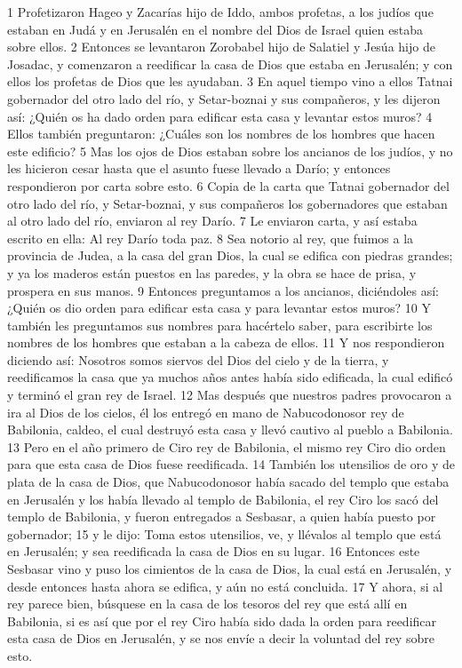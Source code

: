 1 Profetizaron Hageo y Zacarías hijo de Iddo, ambos profetas, a los judíos que estaban en Judá y en Jerusalén en el nombre del Dios de Israel quien estaba sobre ellos.
2 Entonces se levantaron Zorobabel hijo de Salatiel y Jesúa hijo de Josadac, y comenzaron a reedificar la casa de Dios que estaba en Jerusalén; y con ellos los profetas de Dios que les ayudaban.
3 En aquel tiempo vino a ellos Tatnai gobernador del otro lado del río, y Setar-boznai y sus compañeros, y les dijeron así: ¿Quién os ha dado orden para edificar esta casa y levantar estos muros?
4 Ellos también preguntaron: ¿Cuáles son los nombres de los hombres que hacen este edificio?
5 Mas los ojos de Dios estaban sobre los ancianos de los judíos, y no les hicieron cesar hasta que el asunto fuese llevado a Darío; y entonces respondieron por carta sobre esto.
6 Copia de la carta que Tatnai gobernador del otro lado del río, y Setar-boznai, y sus compañeros los gobernadores que estaban al otro lado del río, enviaron al rey Darío.
7 Le enviaron carta, y así estaba escrito en ella: Al rey Darío toda paz.
8 Sea notorio al rey, que fuimos a la provincia de Judea, a la casa del gran Dios, la cual se edifica con piedras grandes; y ya los maderos están puestos en las paredes, y la obra se hace de prisa, y prospera en sus manos.
9 Entonces preguntamos a los ancianos, diciéndoles así: ¿Quién os dio orden para edificar esta casa y para levantar estos muros?
10 Y también les preguntamos sus nombres para hacértelo saber, para escribirte los nombres de los hombres que estaban a la cabeza de ellos.
11 Y nos respondieron diciendo así: Nosotros somos siervos del Dios del cielo y de la tierra, y reedificamos la casa que ya muchos años antes había sido edificada, la cual edificó y terminó el gran rey de Israel.
12 Mas después que nuestros padres provocaron a ira al Dios de los cielos, él los entregó en mano de Nabucodonosor rey de Babilonia, caldeo, el cual destruyó esta casa y llevó cautivo al pueblo a Babilonia. 
13 Pero en el año primero de Ciro rey de Babilonia, el mismo rey Ciro dio orden para que esta casa de Dios fuese reedificada. 
14 También los utensilios de oro y de plata de la casa de Dios, que Nabucodonosor había sacado del templo que estaba en Jerusalén y los había llevado al templo de Babilonia, el rey Ciro los sacó del templo de Babilonia, y fueron entregados a Sesbasar, a quien había puesto por gobernador;
15 y le dijo: Toma estos utensilios, ve, y llévalos al templo que está en Jerusalén; y sea reedificada la casa de Dios en su lugar.
16 Entonces este Sesbasar vino y puso los cimientos de la casa de Dios, la cual está en Jerusalén, y desde entonces hasta ahora se edifica, y aún no está concluida.
17 Y ahora, si al rey parece bien, búsquese en la casa de los tesoros del rey que está allí en Babilonia, si es así que por el rey Ciro había sido dada la orden para reedificar esta casa de Dios en Jerusalén, y se nos envíe a decir la voluntad del rey sobre esto.

